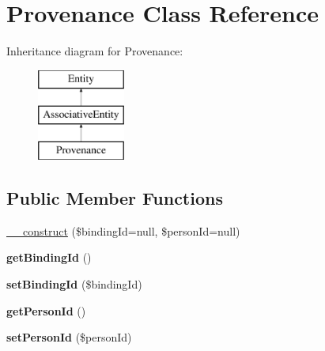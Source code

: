 \hypertarget{classProvenance}{
\section{Provenance Class Reference}
\label{classProvenance}
}
Inheritance diagram for Provenance:\begin{figure}[H]
\begin{center}
\leavevmode
\includegraphics[height=3.000000cm]{classProvenance}
\end{center}
\end{figure}
\subsection*{Public Member Functions}
\begin{DoxyCompactItemize}
\item 
\hyperlink{classProvenance_a12d0b0930da213236d769da23b5b9f9b}{\_\-\_\-construct} (\$bindingId=null, \$personId=null)
\item 
\hypertarget{classProvenance_a5424205b774731f2d7593d3eb54e6139}{
{\bfseries getBindingId} ()}
\label{classProvenance_a5424205b774731f2d7593d3eb54e6139}

\item 
\hypertarget{classProvenance_ac4807d68357d3f3025c949658ba3d4e6}{
{\bfseries setBindingId} (\$bindingId)}
\label{classProvenance_ac4807d68357d3f3025c949658ba3d4e6}

\item 
\hypertarget{classProvenance_a896bd7918291bde6e3a9d271a73f4460}{
{\bfseries getPersonId} ()}
\label{classProvenance_a896bd7918291bde6e3a9d271a73f4460}

\item 
\hypertarget{classProvenance_a51836d2d53b9964d17d83b2e9ddcaa55}{
{\bfseries setPersonId} (\$personId)}
\label{classProvenance_a51836d2d53b9964d17d83b2e9ddcaa55}

\end{DoxyCompactItemize}
